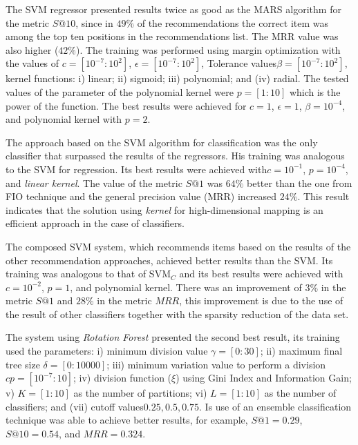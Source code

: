 \documentclass{doublecol-new}
\theoremstyle{TH}{
\newtheorem{lemma}{Lemma}
\newtheorem{theorem}[lemma]{Theorem}
\newtheorem{corrolary}[lemma]{Corrolary}
\newtheorem{conjecture}[lemma]{Conjecture}
\newtheorem{proposition}[lemma]{Proposition}
\newtheorem{claim}[lemma]{Claim}
\newtheorem{stheorem}[lemma]{Wrong Theorem}
\newtheorem{algorithm}{Algorithm}
}
\theoremstyle{THrm}{
\newtheorem{definition}{Definition}[section]
\newtheorem{question}{Question}[section]
\newtheorem{remark}{Remark}
\newtheorem{scheme}{Scheme}
}
\theoremstyle{THhit}{
\newtheorem{case}{Case}[section]
}
\begin{document}
The SVM regressor presented results twice as good as the MARS algorithm for the metric \(S@10\), since in \(49\%\) of the recommendations the correct item was among the top ten positions in the recommendations list. The MRR value was also higher (\(42\%\)). The training was performed using margin optimization with the values ​​of \(c = [10^{-7}:10^2]\), \(\epsilon = [10^{-7}:10^{2}]\), Tolerance values ​​\(\beta = [10^{-7}:10^{2}]\),  kernel functions: i) linear; ii) sigmoid; iii) polynomial; and (iv) radial. The tested values of the parameter of the polynomial kernel were  \(p = [1:10]\) which is the power of the function. The best results were achieved for \(c = 1\), \(\epsilon = 1\), \(\beta = 10^{-4}\), and polynomial kernel with \(p = 2\). %

The approach based on the SVM algorithm for classification was the only classifier that surpassed the results of the regressors. His training was analogous to the SVM for regression. Its best results were achieved with ​\(c = 10^{-1}\), \(p = 10^{-4}\), and \emph{linear kernel}. The value of the metric \(S@1\) was \(64\%\) better than the one from FIO technique and the general precision value (MRR) increased \(24\%\). This result indicates that the solution using \emph{kernel} for high-dimensional mapping is an efficient approach in the case of classifiers.

The composed SVM system, which recommends items based on the results of the other recommendation approaches, achieved better results than the SVM. Its training was analogous to that of SVM\(_C\) and its best results were achieved with \(c = 10^{-2}\), \(p = 1\), and polynomial kernel. There was an improvement of \(3\%\) in the metric \(S@1\) and \(28\%\) in the metric \(MRR\), this improvement is due to the use of the result of other classifiers together with the sparsity reduction of the data set.

The system using \emph{Rotation Forest} presented the second best result, its training used the parameters: i) minimum division value \(\gamma = [0:30]\); ii) maximum final tree size \(\delta = [0:10000]\); iii) minimum variation value to perform a division \(cp = [10^{-7}:10]\); iv) division function (\(\xi\)) using Gini Index and Information Gain; v) \(K = [1:10]\) as the number of partitions; vi) \(L = [1:10]\) as the number of classifiers; and (vii) cutoff values ​​\(0.25, 0.5, 0.75\). Is use of an ensemble classification technique was able to achieve better results, for example, \(S@1 = 0.29\), \(S@10 = 0.54\), and \(MRR = 0.324\).
\end{document}
